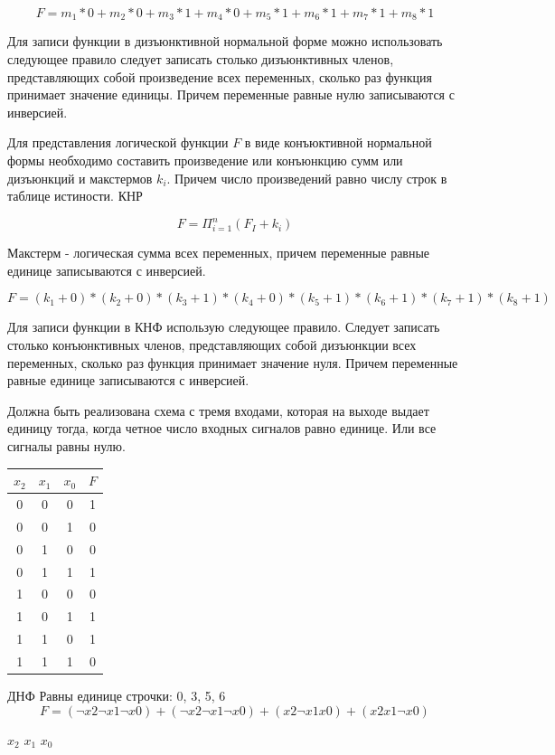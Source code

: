 \documentclass[a4paper]{article}
\begin{document}
$$ F = m_1*0 + m_2*0 + m_3*1 + m_4*0 + m_5*1 + m_6*1 + m_7*1 + m_8*1$$

Для записи функции в дизъюнктивной нормальной форме можно использовать следующее правило следует записать столько дизъюнктивных членов, представляющих собой произведение всех переменных, сколько раз функция принимает значение единицы. Причем переменные равные нулю записываются с инверсией.

Для представления логической функции $F$ в виде конъюктивной нормальной формы необходимо составить произведение или конъюнкцию сумм или дизъюнкций и макстермов $k_i$. Причем число произведений равно числу строк в таблице истиности.
КНР

$$ F = \Pi_{i=1}^n (F_I + k_i) $$

Макстерм - логическая сумма всех переменных, причем переменные равные единице записываются с инверсией.

$$ F = (k_1 + 0) * (k_2 + 0) * (k_3 + 1) * (k_4 + 0) * (k_5 + 1) * (k_6 + 1) * (k_7 + 1) * (k_8 + 1)$$

Для записи функции в КНФ использую следующее правило. Следует записать столько конъюнктивных членов, представляющих собой дизъюнкции всех переменных, сколько раз функция принимает значение нуля. Причем переменные равные единице записываются с инверсией.

Должна быть реализована схема с тремя входами, которая на выходе выдает единицу тогда, когда четное число входных сигналов равно единице.
Или все сигналы равны нулю.

\begin{table}[ht]
\centering
\begin{tabular}{|c|c|c|c|}
\hline
$x_2$ & $x_1$ & $x_0$ & $F$ \\
\hline
0 & 0 & 0 & 1 \\
0 & 0 & 1 & 0 \\
0 & 1 & 0 & 0 \\
0 & 1 & 1 & 1 \\
1 & 0 & 0 & 0 \\
1 & 0 & 1 & 1 \\
1 & 1 & 0 & 1 \\
1 & 1 & 1 & 0 \\
\hline
\end{tabular}
\end{table}

ДНФ
Равны единице строчки: 0, 3, 5, 6
$$ F = (\neg x2\neg x1\neg x0) + (\neg x2\neg x1\neg x0) + (x2\neg x1x0) + (x2x1\neg x0)$$

$ x_2 $
$ x_1 $
$ x_0 $
\end{document}
